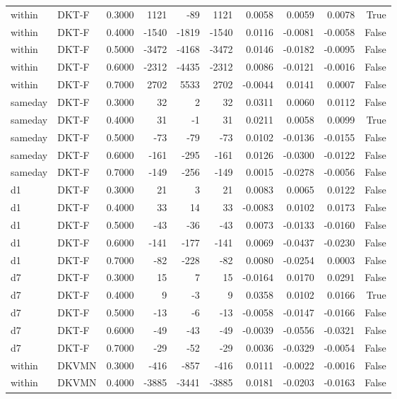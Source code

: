 \begin{tabular}{llrrrrrrrr}
within & DKT-F & 0.3000 & 1121 & -89 & 1121 & 0.0058 & 0.0059 & 0.0078 & True \\
within & DKT-F & 0.4000 & -1540 & -1819 & -1540 & 0.0116 & -0.0081 & -0.0058 & False \\
within & DKT-F & 0.5000 & -3472 & -4168 & -3472 & 0.0146 & -0.0182 & -0.0095 & False \\
within & DKT-F & 0.6000 & -2312 & -4435 & -2312 & 0.0086 & -0.0121 & -0.0016 & False \\
within & DKT-F & 0.7000 & 2702 & 5533 & 2702 & -0.0044 & 0.0141 & 0.0007 & False \\
sameday & DKT-F & 0.3000 & 32 & 2 & 32 & 0.0311 & 0.0060 & 0.0112 & False \\
sameday & DKT-F & 0.4000 & 31 & -1 & 31 & 0.0211 & 0.0058 & 0.0099 & True \\
sameday & DKT-F & 0.5000 & -73 & -79 & -73 & 0.0102 & -0.0136 & -0.0155 & False \\
sameday & DKT-F & 0.6000 & -161 & -295 & -161 & 0.0126 & -0.0300 & -0.0122 & False \\
sameday & DKT-F & 0.7000 & -149 & -256 & -149 & 0.0015 & -0.0278 & -0.0056 & False \\
d1 & DKT-F & 0.3000 & 21 & 3 & 21 & 0.0083 & 0.0065 & 0.0122 & False \\
d1 & DKT-F & 0.4000 & 33 & 14 & 33 & -0.0083 & 0.0102 & 0.0173 & False \\
d1 & DKT-F & 0.5000 & -43 & -36 & -43 & 0.0073 & -0.0133 & -0.0160 & False \\
d1 & DKT-F & 0.6000 & -141 & -177 & -141 & 0.0069 & -0.0437 & -0.0230 & False \\
d1 & DKT-F & 0.7000 & -82 & -228 & -82 & 0.0080 & -0.0254 & 0.0003 & False \\
d7 & DKT-F & 0.3000 & 15 & 7 & 15 & -0.0164 & 0.0170 & 0.0291 & False \\
d7 & DKT-F & 0.4000 & 9 & -3 & 9 & 0.0358 & 0.0102 & 0.0166 & True \\
d7 & DKT-F & 0.5000 & -13 & -6 & -13 & -0.0058 & -0.0147 & -0.0166 & False \\
d7 & DKT-F & 0.6000 & -49 & -43 & -49 & -0.0039 & -0.0556 & -0.0321 & False \\
d7 & DKT-F & 0.7000 & -29 & -52 & -29 & 0.0036 & -0.0329 & -0.0054 & False \\
within & DKVMN & 0.3000 & -416 & -857 & -416 & 0.0111 & -0.0022 & -0.0016 & False \\
within & DKVMN & 0.4000 & -3885 & -3441 & -3885 & 0.0181 & -0.0203 & -0.0163 & False \\

\end{tabular}

